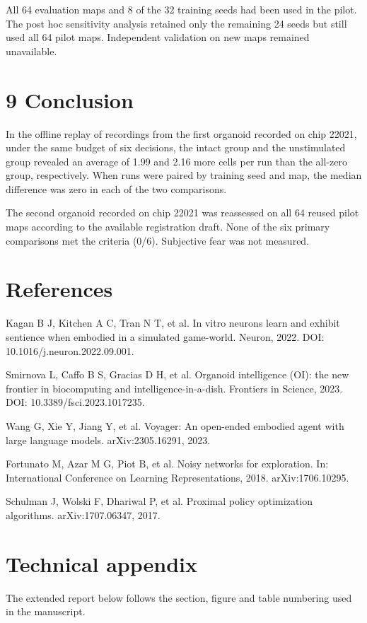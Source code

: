 \documentclass{article}
\begin{document}
All 64 evaluation maps and 8 of the 32 training seeds had been used in the pilot. The post hoc sensitivity analysis retained only the remaining 24 seeds but still used all 64 pilot maps. Independent validation on new maps remained unavailable.


\section*{9 Conclusion}

In the offline replay of recordings from the first organoid recorded on chip 22021, under the same budget of six decisions, the intact group and the unstimulated group revealed an average of 1.99 and 2.16 more cells per run than the all-zero group, respectively. When runs were paired by training seed and map, the median difference was zero in each of the two comparisons.


The second organoid recorded on chip 22021 was reassessed on all 64 reused pilot maps according to the available registration draft. None of the six primary comparisons met the criteria (0/6). Subjective fear was not measured.

\clearpage
\section*{References}

\noindent [1] Kagan B J, Kitchen A C, Tran N T, et al. In vitro neurons learn and exhibit sentience when embodied in a simulated game-world. Neuron, 2022. DOI: 10.1016/j.neuron.2022.09.001.


\noindent [2] Smirnova L, Caffo B S, Gracias D H, et al. Organoid intelligence (OI): the new frontier in biocomputing and intelligence-in-a-dish. Frontiers in Science, 2023. DOI: 10.3389/fsci.2023.1017235.


\noindent [3] Wang G, Xie Y, Jiang Y, et al. Voyager: An open-ended embodied agent with large language models. arXiv:2305.16291, 2023.


\noindent [4] Fortunato M, Azar M G, Piot B, et al. Noisy networks for exploration. In: International Conference on Learning Representations, 2018. arXiv:1706.10295.


\noindent [5] Schulman J, Wolski F, Dhariwal P, et al. Proximal policy optimization algorithms. arXiv:1707.06347, 2017.

\clearpage
\section*{Technical appendix}
The extended report below follows the section, figure and table numbering used in the manuscript.
\end{document}
